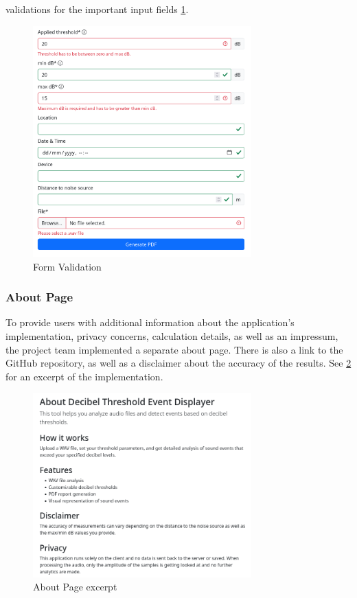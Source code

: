 validations for the important input fields \ref{fig:implementation-validation}.
\begin{figure}[H]
    \centering
    \includegraphics[width=0.75\textwidth]{../assets/implementation_validation.png}
    \caption{Form Validation}\label{fig:implementation-validation}
\end{figure}

\subsubsection{About Page}\label{subsubsec:about-page}
To provide users with additional information about the application's implementation, privacy concerns, calculation details, as well as an impressum, the project team implemented
a separate about page. There is also a link to the GitHub repository, as well as a disclaimer about the accuracy of the results. See \ref{fig:implementation-about-page} for an excerpt of the implementation.
\begin{figure}[H]
    \centering
    \includegraphics[width=0.75\textwidth]{../assets/implementation_about_page.png}
    \caption{About Page excerpt}\label{fig:implementation-about-page}
\end{figure}

